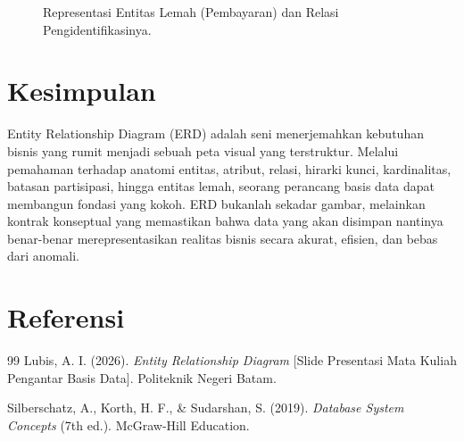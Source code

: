 \documentclass[11pt,a4paper]{article}
\begin{document}
\begin{figure}[H]
	\centering
	\caption{Representasi Entitas Lemah (Pembayaran) dan Relasi Pengidentifikasinya.}
	\label{fig:weak}
\end{figure}

\section{Kesimpulan}

Entity Relationship Diagram (ERD) adalah seni menerjemahkan kebutuhan bisnis yang rumit menjadi sebuah peta visual yang terstruktur. Melalui pemahaman terhadap anatomi entitas, atribut, relasi, hirarki kunci, kardinalitas, batasan partisipasi, hingga entitas lemah, seorang perancang basis data dapat membangun fondasi yang kokoh. ERD bukanlah sekadar gambar, melainkan kontrak konseptual yang memastikan bahwa data yang akan disimpan nantinya benar-benar merepresentasikan realitas bisnis secara akurat, efisien, dan bebas dari anomali.

\newpage
\section*{Referensi}

\begin{thebibliography}{99}
	Lubis, A. I. (2026). \textit{Entity Relationship Diagram} [Slide Presentasi Mata Kuliah Pengantar Basis Data]. Politeknik Negeri Batam.

	Silberschatz, A., Korth, H. F., \& Sudarshan, S. (2019). \textit{Database System Concepts} (7th ed.). McGraw-Hill Education.
\end{thebibliography}
\end{document}
